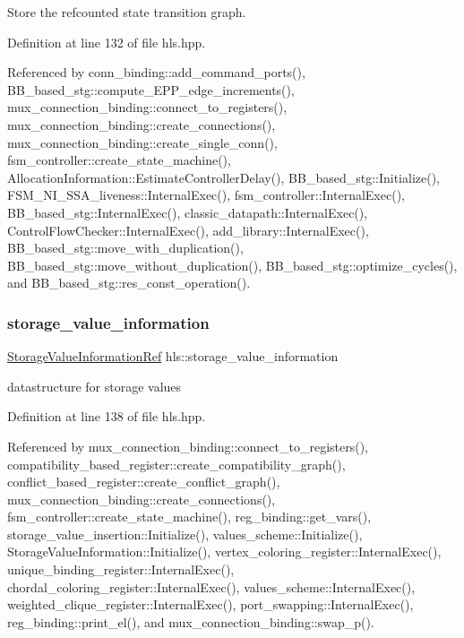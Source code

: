 Store the refcounted state transition graph. 



Definition at line 132 of file hls.\+hpp.



Referenced by conn\+\_\+binding\+::add\+\_\+command\+\_\+ports(), B\+B\+\_\+based\+\_\+stg\+::compute\+\_\+\+E\+P\+P\+\_\+edge\+\_\+increments(), mux\+\_\+connection\+\_\+binding\+::connect\+\_\+to\+\_\+registers(), mux\+\_\+connection\+\_\+binding\+::create\+\_\+connections(), mux\+\_\+connection\+\_\+binding\+::create\+\_\+single\+\_\+conn(), fsm\+\_\+controller\+::create\+\_\+state\+\_\+machine(), Allocation\+Information\+::\+Estimate\+Controller\+Delay(), B\+B\+\_\+based\+\_\+stg\+::\+Initialize(), F\+S\+M\+\_\+\+N\+I\+\_\+\+S\+S\+A\+\_\+liveness\+::\+Internal\+Exec(), fsm\+\_\+controller\+::\+Internal\+Exec(), B\+B\+\_\+based\+\_\+stg\+::\+Internal\+Exec(), classic\+\_\+datapath\+::\+Internal\+Exec(), Control\+Flow\+Checker\+::\+Internal\+Exec(), add\+\_\+library\+::\+Internal\+Exec(), B\+B\+\_\+based\+\_\+stg\+::move\+\_\+with\+\_\+duplication(), B\+B\+\_\+based\+\_\+stg\+::move\+\_\+without\+\_\+duplication(), B\+B\+\_\+based\+\_\+stg\+::optimize\+\_\+cycles(), and B\+B\+\_\+based\+\_\+stg\+::res\+\_\+const\+\_\+operation().

\mbox{\label{classhls_a513ceea78f0966ebd6080121fc717296}} 
\subsubsection{\texorpdfstring{storage\+\_\+value\+\_\+information}{storage\_value\_information}}
{\footnotesize\ttfamily \hyperlink{storage__value__information_8hpp_a9a4a3df6cd31ca08bb2a497f8944ca34}{Storage\+Value\+Information\+Ref} hls\+::storage\+\_\+value\+\_\+information}



datastructure for storage values 



Definition at line 138 of file hls.\+hpp.



Referenced by mux\+\_\+connection\+\_\+binding\+::connect\+\_\+to\+\_\+registers(), compatibility\+\_\+based\+\_\+register\+::create\+\_\+compatibility\+\_\+graph(), conflict\+\_\+based\+\_\+register\+::create\+\_\+conflict\+\_\+graph(), mux\+\_\+connection\+\_\+binding\+::create\+\_\+connections(), fsm\+\_\+controller\+::create\+\_\+state\+\_\+machine(), reg\+\_\+binding\+::get\+\_\+vars(), storage\+\_\+value\+\_\+insertion\+::\+Initialize(), values\+\_\+scheme\+::\+Initialize(), Storage\+Value\+Information\+::\+Initialize(), vertex\+\_\+coloring\+\_\+register\+::\+Internal\+Exec(), unique\+\_\+binding\+\_\+register\+::\+Internal\+Exec(), chordal\+\_\+coloring\+\_\+register\+::\+Internal\+Exec(), values\+\_\+scheme\+::\+Internal\+Exec(), weighted\+\_\+clique\+\_\+register\+::\+Internal\+Exec(), port\+\_\+swapping\+::\+Internal\+Exec(), reg\+\_\+binding\+::print\+\_\+el(), and mux\+\_\+connection\+\_\+binding\+::swap\+\_\+p().

